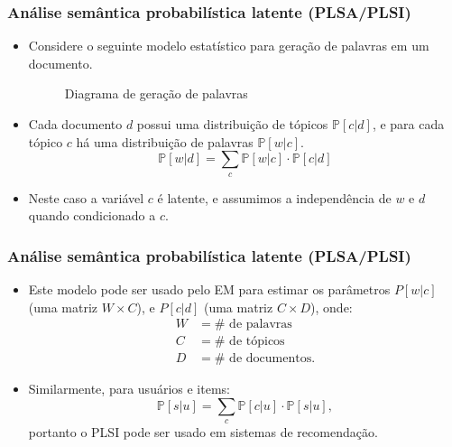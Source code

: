 \documentclass{beamer}
\newcommand{\Prob}{\mathbb{P}}
\begin{document}
\begin{frame}
	
	\frametitle{Análise semântica probabilística latente (PLSA/PLSI)}
	\pause
	\begin{itemize}
		\item Considere o seguinte modelo estatístico para geração de palavras
		em um documento.

		\begin{figure}[ht!]
			\centering
			\caption{Diagrama de geração de palavras}
		\end{figure}
		\pause
		\item Cada documento $d$ possui uma distribuição de tópicos
		$\Prob[c|d]$, e para cada tópico $c$ há uma distribuição de 
		palavras $\Prob[w|c]$. \pause
		\[
			\Prob[w|d] = \sum_{c} \Prob[w|c]\cdot \Prob[c|d]
		\]
		\pause
		\item Neste caso a variável $c$ é latente, e assumimos a independência
		de $w$ e $d$ quando condicionado a $c$.
	
	\end{itemize}
\end{frame}

\begin{frame}

	\frametitle{Análise semântica probabilística latente (PLSA/PLSI)}
	\begin{itemize}
	\item Este modelo pode ser usado pelo EM para estimar os parâmetros
	$P[w|c]$ (uma matriz $W\times C$), e $P[c|d]$ (uma matriz $C\times D$),
	onde: \pause
	\begin{align*}
	W&= \# \text{ de palavras} \\
	C&= \# \text{ de tópicos} \\
	D&= \# \text{ de documentos}.
	\end{align*}
	\pause
	\item Similarmente, para usuários e items:
	\[
	  \Prob[s|u] = \sum_{c} \Prob[c|u] \cdot \Prob[s|u],
	\]
	\pause
	portanto o PLSI pode ser usado em sistemas de recomendação.
	\end{itemize}

\end{frame}
\end{document}
